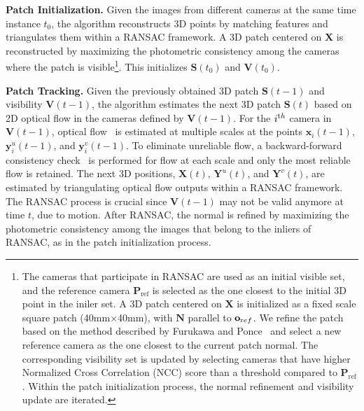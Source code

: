 \noindent \textbf{Patch Initialization.} Given the images from different cameras at the same time instance $t_0$, the algorithm reconstructs 3D points by matching features and triangulates them within a RANSAC framework. A 3D patch centered on $\mathbf{X}$ is reconstructed by maximizing the photometric consistency among the cameras where the patch is visible\footnote{The cameras that participate in RANSAC are used as an initial visible set, and the reference camera $\mathbf{P}_{\textrm{ref}}$ is selected as the one closest to the initial 3D point in the iniler set. A 3D patch centered on $\mathbf{X}$ is initialized as a fixed scale square patch (40mm$\times$40mm), with $\mathbf{N}$ parallel to $\mathbf{o}_{\textrm ref}$. We refine the patch based on the method described by Furukawa and Ponce~\cite{Furukawa2010} and select a new reference camera as the one closest to the current patch normal. The corresponding visibility set is updated by selecting cameras that have higher Normalized Cross Correlation (NCC) score than a threshold compared to $\mathbf{P}_{\textrm{ref}}$. Within the patch initialization process, the normal refinement and visibility update are iterated.}. This initializes $\mathbf{S}(t_0)$ and $\mathbf{V}(t_0)$.

\noindent \textbf{Patch Tracking.} Given the previously obtained 3D patch $\mathbf{S}(t-1)$ and visibility $\mathbf{V}(t-1)$, the algorithm estimates the next 3D patch $\mathbf{S}(t)$ based on 2D optical flow in the cameras defined by $\mathbf{V}(t-1)$. For the $i^{\textrm th}$ camera in $\mathbf{V}(t-1)$, optical flow~\cite{Lucas1981} is estimated at multiple scales at the points $\mathbf{x}_i(t-1)$, $\mathbf{y}^u_i(t-1)$, and $\mathbf{y}^v_i(t-1)$. To eliminate unreliable flow, a backward-forward consistency check~\cite{sundaram2010dense} is performed for flow at each scale and only the most reliable flow is retained. The next 3D positions, $\mathbf{X}(t)$, $\mathbf{Y}^{u}(t)$, and $\mathbf{Y}^{v}(t)$, are estimated by triangulating optical flow outputs within a RANSAC framework. The RANSAC process is crucial since $\mathbf{V}(t-1)$ may not be valid anymore at time $t$, due to motion. After RANSAC, the normal is refined by maximizing the photometric consistency among the images that belong to the inliers of RANSAC, as in the patch initialization process.


